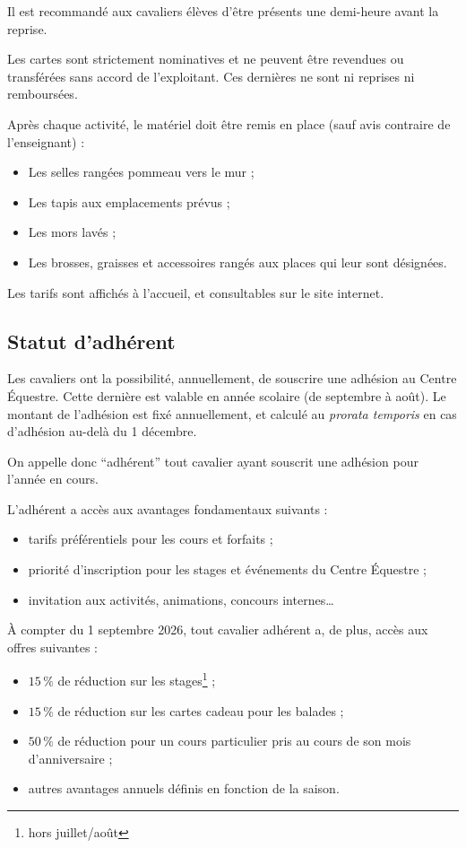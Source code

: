 \documentclass[11pt,a4paper]{article}
\begin{document}
   Il est recommandé aux cavaliers élèves d'être présents une demi-heure avant la reprise.

   Les cartes sont strictement nominatives et ne peuvent être revendues ou transférées sans accord de l'exploitant.
   Ces dernières ne sont ni reprises ni remboursées.

   Après chaque activité, le matériel doit être remis en place (sauf avis contraire de l'enseignant) :
   \begin{itemize}
      \item
      Les selles rangées pommeau vers le mur ;
      \item
      Les tapis aux emplacements prévus ;
      \item
      Les mors lavés ;
      \item
      Les brosses, graisses et accessoires rangés aux places qui leur sont désignées.
   \end{itemize}

   Les tarifs sont affichés à l'accueil, et consultables sur le site internet.

   \subsection{Statut d'adhérent}\label{subsec:statut-d'adherent}
   Les cavaliers ont la possibilité, annuellement, de souscrire une adhésion au Centre Équestre.
   Cette dernière est valable en année scolaire (de septembre à août).
   Le montant de l'adhésion est fixé annuellement, et calculé au \textit{prorata temporis} en cas d'adhésion au-delà du 1\ier{} décembre.

   On appelle donc \enquote{adhérent} tout cavalier ayant souscrit une adhésion pour l'année en cours.

   L'adhérent a accès aux avantages fondamentaux suivants :
   \begin{itemize}
      \item tarifs préférentiels pour les cours et forfaits ;
      \item priorité d'inscription pour les stages et événements du Centre Équestre ;
      \item invitation aux activités, animations, concours internes\dots
   \end{itemize}

   À compter du 1\ier{} septembre 2026, tout cavalier adhérent a, de plus, accès aux offres suivantes :
   \begin{itemize}
      \item $15\, \%$ de réduction sur les stages\footnote{hors juillet/août} ;
      \item $15\, \%$ de réduction sur les cartes cadeau pour les balades ;
      \item $50\, \%$ de réduction pour un cours particulier pris au cours de son mois d'anniversaire ;
      \item autres avantages annuels définis en fonction de la saison.
   \end{itemize}
\end{document}
